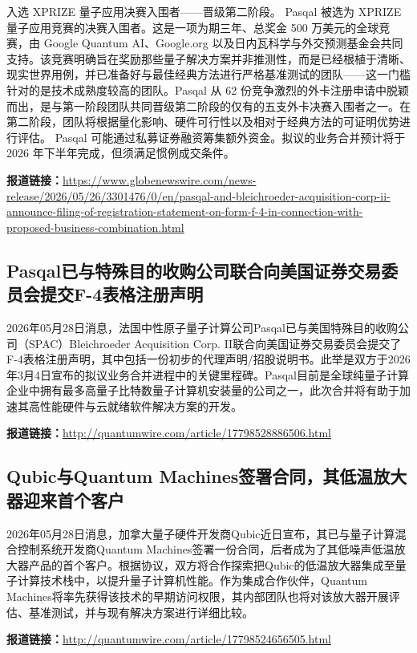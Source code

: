 \documentclass[12pt,a4paper]{ctexart}
\begin{document}
入选 XPRIZE 量子应用决赛入围者——晋级第二阶段。
Pasqal 被选为 XPRIZE 量子应用竞赛的决赛入围者。这是一项为期三年、总奖金 500 万美元的全球竞赛，由 Google Quantum AI、Google.org 以及日内瓦科学与外交预测基金会共同支持。该竞赛明确旨在奖励那些量子解决方案并非推测性，而是已经根植于清晰、现实世界用例，并已准备好与最佳经典方法进行严格基准测试的团队——这一门槛针对的是技术成熟度较高的团队。Pasqal 从 62 份竞争激烈的外卡注册申请中脱颖而出，是与第一阶段团队共同晋级第二阶段的仅有的五支外卡决赛入围者之一。在第二阶段，团队将根据量化影响、硬件可行性以及相对于经典方法的可证明优势进行评估。
Pasqal 可能通过私募证券融资筹集额外资金。拟议的业务合并预计将于 2026 年下半年完成，但须满足惯例成交条件。

\noindent\textbf{报道链接：}\url{https://www.globenewswire.com/news-release/2026/05/26/3301476/0/en/pasqal-and-bleichroeder-acquisition-corp-ii-announce-filing-of-registration-statement-on-form-f-4-in-connection-with-proposed-business-combination.html}

\subsection{ Pasqal已与特殊目的收购公司联合向美国证券交易委员会提交F-4表格注册声明 }

2026年05月28日消息，法国中性原子量子计算公司Pasqal已与美国特殊目的收购公司（SPAC）Bleichroeder Acquisition Corp. II联合向美国证券交易委员会提交了F-4表格注册声明，其中包括一份初步的代理声明/招股说明书。此举是双方于2026年3月4日宣布的拟议业务合并进程中的关键里程碑。Pasqal目前是全球纯量子计算企业中拥有最多高量子比特数量子计算机安装量的公司之一，此次合并将有助于加速其高性能硬件与云就绪软件解决方案的开发。

\noindent\textbf{报道链接：}\url{http://quantumwire.com/article/17798528886506.html}

\subsection{ Qubic与Quantum Machines签署合同，其低温放大器迎来首个客户 }

2026年05月28日消息，加拿大量子硬件开发商Qubic近日宣布，其已与量子计算混合控制系统开发商Quantum Machines签署一份合同，后者成为了其低噪声低温放大器产品的首个客户。根据协议，双方将合作探索把Qubic的低温放大器集成至量子计算技术栈中，以提升量子计算机性能。作为集成合作伙伴，Quantum Machines将率先获得该技术的早期访问权限，其内部团队也将对该放大器开展评估、基准测试，并与现有解决方案进行详细比较。

\noindent\textbf{报道链接：}\url{http://quantumwire.com/article/17798524656505.html}
\end{document}

